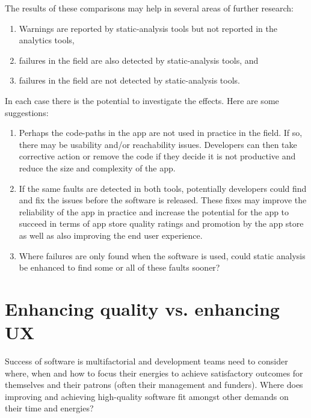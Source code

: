 The results of these comparisons may help in several areas of further research:
\begin{enumerate}
    \item Warnings are reported by static-analysis tools but not reported in the analytics tools,
    \item failures in the field are also detected by static-analysis tools, and
    \item failures in the field are not detected by static-analysis tools.
\end{enumerate}

In each case there is the potential to investigate the effects. Here are some suggestions:
\begin{enumerate}
    \item Perhaps the code-paths in the app are not used in practice in the field. If so, there may be usability and/or reachability issues. Developers can then take corrective action or remove the code if they decide it is not productive and reduce the size and complexity of the app.
    \item If the same faults are detected in both tools, potentially developers could find and fix the issues before the software is released. These fixes may improve the reliability of the app in practice and increase the potential for the app to succeed in terms of app store quality ratings and promotion by the app store as well as also improving the end user experience.
    \item Where failures are only found when the software is used, could static analysis be enhanced to find some or all of these faults sooner?
\end{enumerate}

\section{Enhancing quality vs. enhancing UX}\label{enhancing-quality-vs-enhancing-ux}
Success of software is multifactorial and development teams need to consider where, when and how to focus their energies to achieve satisfactory outcomes for themselves and their patrons (often their management and funders). Where does improving and achieving high-quality software fit amongst other demands on their time and energies?

